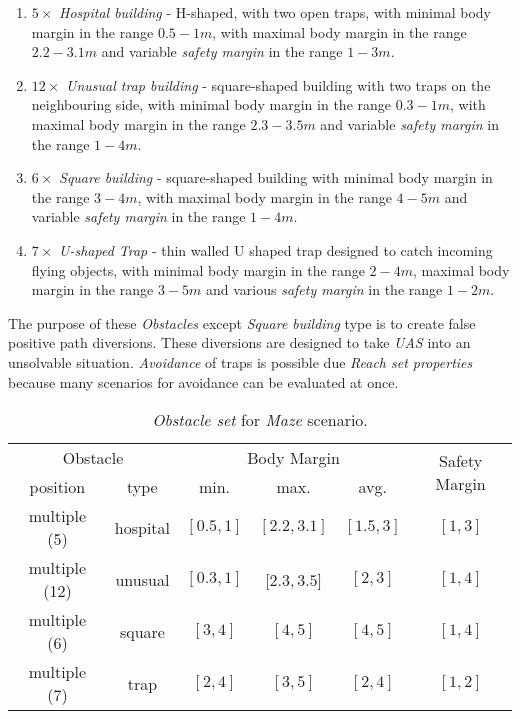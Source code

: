 \begin{enumerate}
    \item $5\times$  \emph{Hospital building} - H-shaped, with two open traps, with minimal body margin in the range $0.5 - 1m$, with maximal body margin in the range $2.2 - 3.1 m$ and variable \emph{safety margin} in the range $1-3 m$.
    
    \item $12\times$ \emph{Unusual trap building} - square-shaped building with two traps on the neighbouring side, with minimal body margin in the range $0.3 - 1m$, with maximal body margin in the range $2.3 - 3.5 m$ and variable \emph{safety margin} in the range $1-4 m$.
    
    \item $6\times$  \emph{Square building} - square-shaped building with minimal body margin in the range $3-4 m$, with maximal body margin in the range $4-5 m$ and variable \emph{safety margin} in the range $1-4m$.
    
    \item $7\times$  \emph{U-shaped Trap} - thin walled U shaped trap designed to catch incoming flying objects, with minimal body margin in the range $2-4m$, maximal body margin in the range $3-5 m$ and various \emph{safety margin} in the range $1-2 m$.
\end{enumerate}

The purpose of these \emph{Obstacles} except \emph{Square building} type is to create false positive path diversions. These diversions are designed to take \emph{UAS} into an unsolvable situation. \emph{Avoidance} of traps is possible due \emph{Reach set properties} because many scenarios for avoidance can be evaluated at once.

\begin{table}[H]
    \centering
    \begin{tabular}{c|c|c|c|c|c}
        \multicolumn{2}{c|}{Obstacle} & \multicolumn{3}{c|}{Body Margin} & \multirow{2}{*}{Safety Margin}\\\cline{1-5}
        position & type & min. & max. & avg. &   \\\hline\hline
        multiple (5) & hospital & $[0.5,1]$ & $[2.2,3.1]$ & $[1.5,3]$  & $[1,3]$ \\\hline 
        multiple (12) & unusual  & $[0.3,1]$ & $[2.3,3.5$] & $[2,3]$    & $[1,4]$ \\\hline
        multiple (6) & square   & $[3,4]$   & $[4,5]$     & $[4,5]$    & $[1,4]$ \\\hline
        multiple (7) & trap     & $[2,4]$   & $[3,5]$     & $[2,4]$    & $[1,2]$ \\
     \end{tabular}
    \caption{\emph{Obstacle set} for \emph{Maze} scenario.}
    \label{tab:obstacleSetMaze}
\end{table}

